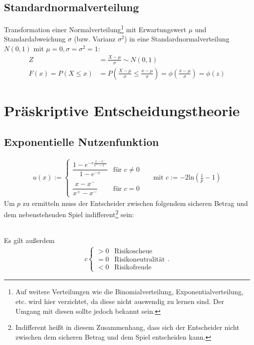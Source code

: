 \documentclass[12pt,a4paper]{scrartcl}
\begin{document}
\subsection{Standardnormalverteilung}
Transformation einer Normalverteilung\footnote{Auf weitere Verteilungen wie die Binomialverteilung, Exponentialverteilung, etc. wird hier verzichtet, da diese nicht auswendig zu lernen sind. Der Umgang mit diesen sollte jedoch bekannt sein.} mit Erwartungswert $ \mu $ und Standardabweichung $ \sigma $ (bzw. Varianz $ \sigma^2 $) in eine Standardnormalverteilung $ N(0,1) $ mit $ \mu = 0, \sigma = \sigma^2 = 1 $:
\begin{align*}
	Z &= \frac{X - \mu}{\sigma} \sim N(0,1)\\
	F(x) = P(X \leq x) &= P\left(\frac{X-\mu}{\sigma} \leq \frac{x-\mu}{\sigma}\right) = \phi \left(\frac{x-\mu}{\sigma}\right) = \phi(z)
\end{align*}

\newpage
\section{Präskriptive Entscheidungstheorie}

\subsection{Exponentielle Nutzenfunktion}
\begin{align*}
	u(x) := \begin{cases}
	\dfrac{1 - e ^{-c\frac{x-x^-}{x^+-x^-}}}{1-e^{-c}} & \text{für } c \neq 0\\\\
	\dfrac{x-x^-}{x^+-x^-} & \text{für } c = 0
	\end{cases} && \text{mit } c := -2\text{ln}\left(\frac{1}{p}-1\right)
\end{align*}
Um $ p $ zu ermitteln muss der Entscheider zwischen folgendem sicheren Betrag und dem nebenstehenden Spiel indifferent\footnote{Indifferent heißt in diesem Zusammenhang, dass sich der Entscheider nicht zwischen dem sicheren Betrag und dem Spiel entscheiden kann.} sein:
\begin{figure}[h]
	\centering
\end{figure}\\
Es gilt außerdem
\begin{align*}
c\left\lbrace \begin{array}{cl}
>0 & \text{Risikoscheue}\\
=0 & \text{Risikoneutralität}\\
<0 & \text{Risikofreude}
\end{array}\right. .
\end{align*}
\end{document}
